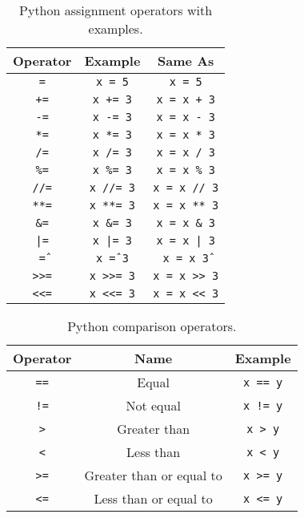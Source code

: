 \begin{table}[H]
\centering
\renewcommand{\arraystretch}{1.3}
\begin{tabular}{|c|c|c|}
\hline
\textbf{Operator} & \textbf{Example} & \textbf{Same As} \\
\hline
\texttt{=}   & \texttt{x = 5}    & \texttt{x = 5} \\
\texttt{+=}  & \texttt{x += 3}   & \texttt{x = x + 3} \\
\texttt{-=}  & \texttt{x -= 3}   & \texttt{x = x - 3} \\
\texttt{*=}  & \texttt{x *= 3}   & \texttt{x = x * 3} \\
\texttt{/=}  & \texttt{x /= 3}   & \texttt{x = x / 3} \\
\texttt{\%=} & \texttt{x \%= 3}  & \texttt{x = x \% 3} \\
\texttt{//=} & \texttt{x //= 3}  & \texttt{x = x // 3} \\
\texttt{**=} & \texttt{x **= 3}  & \texttt{x = x ** 3} \\
\texttt{\&=} & \texttt{x \&= 3}  & \texttt{x = x \& 3} \\
\texttt{|=}  & \texttt{x |= 3}   & \texttt{x = x | 3} \\
\texttt{\^=} & \texttt{x \^= 3}  & \texttt{x = x \^ 3} \\
\texttt{>>=} & \texttt{x >>= 3}  & \texttt{x = x >> 3} \\
\texttt{<<=} & \texttt{x <<= 3}  & \texttt{x = x << 3} \\
\hline
\end{tabular}
\caption{Python assignment operators with examples.}
\end{table}

\begin{table}[h!]
\centering
\renewcommand{\arraystretch}{1.3}
\begin{tabular}{|c|c|c|}
\hline
\textbf{Operator} & \textbf{Name} & \textbf{Example} \\
\hline
\texttt{==} & Equal                    & \texttt{x == y} \\
\texttt{!=} & Not equal                & \texttt{x != y} \\
\texttt{>}  & Greater than             & \texttt{x > y}  \\
\texttt{<}  & Less than                & \texttt{x < y}  \\
\texttt{>=} & Greater than or equal to & \texttt{x >= y} \\
\texttt{<=} & Less than or equal to    & \texttt{x <= y} \\
\hline
\end{tabular}
\caption{Python comparison operators.}
\end{table}

